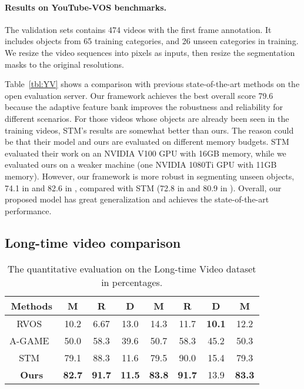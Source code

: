 \documentclass{article}
\begin{document}
\paragraph{Results on YouTube-VOS benchmarks.}
The validation sets contains 474 videos with the first frame annotation. 
It includes objects from 65 training categories, and 26 unseen categories in training. 
We resize the video sequences into  pixels as inputs, then resize the segmentation masks to the original resolutions.

Table~\ref{tbl:YV} shows a comparison with previous state-of-the-art methods on the open evaluation server.
Our framework achieves the best overall score 79.6 because the adaptive feature bank improves the robustness and reliability for different scenarios.
For those videos whose objects are already been seen in the training videos, STM's results are somewhat better than ours.
The reason could be that their model and ours are evaluated on different memory budgets.
STM~\cite{oh_video_2019} evaluated their work on an NVIDIA V100 GPU with 16GB memory, while we evaluated ours on a weaker machine (one NVIDIA 1080Ti GPU with 11GB memory).
However, our framework is more robust in segmenting unseen objects, 74.1 in  and 82.6 in , compared with STM (72.8 in  and 80.9 in ).
Overall, our proposed model has great generalization and achieves the state-of-the-art performance.
  
\subsection{Long-time video comparison}
\begin{table}[h]
  \caption{The quantitative evaluation on the Long-time Video dataset in percentages.}
  \label{tbl:longvideo}
  \centering
  \begin{tabular}{c|cccccc|c}
        \toprule
        Methods &  M &  R &  D &  M &  R &  D &  M\\
        \midrule
        RVOS~\cite{ventura2019rvos}   & 10.2 & 6.67 & 13.0 & 14.3 & 11.7 & \textbf{10.1} & 12.2 \\
        A-GAME~\cite{johnander2019generative} & 50.0 & 58.3 & 39.6 & 50.7 & 58.3 & 45.2 & 50.3 \\
        STM~\cite{oh_video_2019}  & 79.1 & 88.3 & 11.6 & 79.5 & 90.0 & 15.4 & 79.3 \\
        \textbf{Ours}  & \textbf{82.7} & \textbf{91.7} & \textbf{11.5} & \textbf{83.8} & \textbf{91.7} & 13.9 & \textbf{83.3} \\
        \bottomrule
    \end{tabular}
\end{table}
\end{document}
